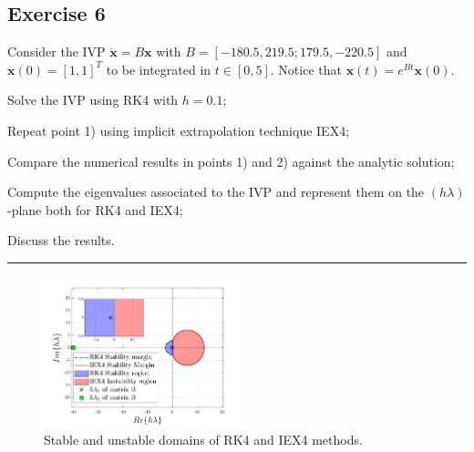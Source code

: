 \documentclass[11pt,a4paper,oneside]{article}
\renewcommand{\vec}[1]{\mathbf{#1}}
\begin{document}
\subsection*{Exercise 6}

Consider the IVP $\dot{\vec x} = B \vec x$ with $B =[-180.5, 219.5; 179.5, -220.5]$ and $\vec{x}(0)=[1, 1]^T$ to be integrated in $t\in[0, 5]$. Notice that $\vec{x}(t)=e^{Bt}\vec{x}(0)$.
\begin{enumerate*}[label=\arabic*)]
    \item Solve the IVP using RK4 with $h=0.1$;
    \item Repeat point 1) using implicit extrapolation technique IEX4;
    \item Compare the numerical results in points 1) and 2) against the analytic solution;
    \item Compute the eigenvalues associated to the IVP and represent them on the $(h\lambda)$-plane both for RK4 and IEX4;
    \item Discuss the results.
\end{enumerate*}

\medskip \hrule \medskip

\begin{figure}
\centering
    \includegraphics[width = 0.52\textwidth]{gfx/ex6_1.pdf}
    \caption{Stable and unstable domains of RK4 and IEX4 methods.}\label{fig:ex6}
\end{figure}
\end{document}
